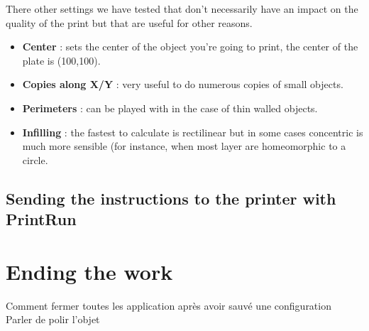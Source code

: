 \documentclass{article}
\begin{document}
There other settings we have tested that don't necessarily have an impact on the quality of the print but that are useful for other reasons.
\begin{itemize}
\item \textbf{Center} : sets the center of the object you're going to print, the center of the plate is (100,100).
\item \textbf{Copies along X/Y} : very useful to do numerous copies of small objects.
\item \textbf{Perimeters} : can be played with in the case of thin walled objects.
\item \textbf{Infilling} : the fastest to calculate is rectilinear but in some cases concentric is much more sensible (for instance, when most layer are homeomorphic to a circle.
\end{itemize}
\subsection{Sending the instructions to the printer with PrintRun}

\newpage

\section{Ending the work}

Comment fermer toutes les application après avoir sauvé une configuration \\
Parler de polir l'objet \\
\end{document}
